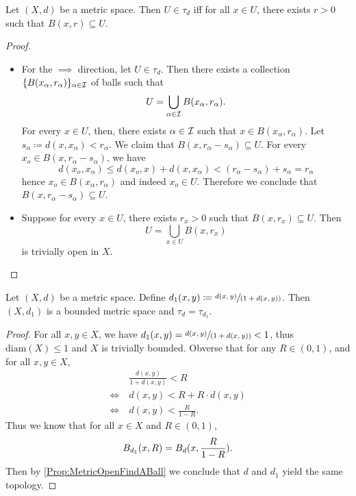 \documentclass[screen,single]{techreport}
\numberwithin{equation}{section}
\begin{document}
\begin{proposition}\label{Prop:MetricOpenFindABall}
	Let $(X,d)$ be a metric space. Then $U \in \tau_d$ iff for all $x \in U$, there exists $r >0$ such that $B(x,r) \subseteq U$.
\end{proposition}
\begin{proof}\
	\begin{itemize}
		\item For the ${\implies}$ direction, let $U \in \tau_d$.
		Then there exists a collection $\{B(x_\alpha,r_\alpha)\}_{\alpha \in \mathcal{I}}$ of balls such that
		\[
		U = \bigcup_{\alpha \in \mathcal{I}} B(x_\alpha,r_\alpha).
		\]
		For every $x \in U$, then, there exists $\alpha \in \mathcal{I}$ such that $x \in B(x_\alpha,r_\alpha)$.
		Let $s_\alpha \coloneqq d(x,x_\alpha) < r_\alpha$.
		We claim that $B(x,r_\alpha-s_\alpha) \subseteq U$.
		For every $x_o \in B(x,r_\alpha-s_\alpha)$, we have
		\[
		d(x_o,x_\alpha) \le d(x_o,x) + d(x,x_\alpha) < (r_\alpha - s_\alpha) + s_\alpha = r_\alpha
		\]
		hence $x_o \in B(x_\alpha,r_\alpha)$ and indeed $x_o \in U$.
		Therefore we conclude that $B(x,r_\alpha-s_\alpha) \subseteq U$.
		
		\item Suppose for every $x \in U$, there exists $r_x > 0$ such that $B(x,r_x) \subseteq U$.
		Then
		\[
		U = \bigcup_{x \in U} B(x,r_x)
		\]
		is trivially open in $X$.
	\end{itemize}
\end{proof}

\begin{proposition}\label{Prop:MetricCanAlwaysBounded}
	Let $(X,d)$ be a metric space.
	Define $d_1(x,y) \coloneqq \sfrac{d(x,y)}{(1 + d(x,y))}$.
	Then $(X,d_1)$ is a bounded metric space and $\tau_d = \tau_{d_1}$.
\end{proposition}
\begin{proof}
	For all $x,y \in X$, we have $d_1(x,y) = \sfrac{d(x,y)}{(1+d(x,y))} < 1$, thus $\mathrm{diam}(X) \le 1$ and $X$ is trivially bounded.
	Obverse that for any $R \in (0,1)$, and for all $x, y \in X$,
	\begin{align*}
		& \frac{d(x,y)}{1+d(x,y)} < R \\
		\iff~ & d(x,y) < R + R \cdot d(x,y) \\
		\iff~ & d(x,y) < \frac{R}{1-R}.
	\end{align*}
	Thus we know that for all $x \in X$ and $R \in (0,1)$,
	\[
	B_{d_1}(x,R) = B_d({x, \frac{R}{1-R} }).
	\]
	Then by \cref{Prop:MetricOpenFindABall} we conclude that $d$ and $d_1$ yield the same topology.
\end{proof}
\end{document}
